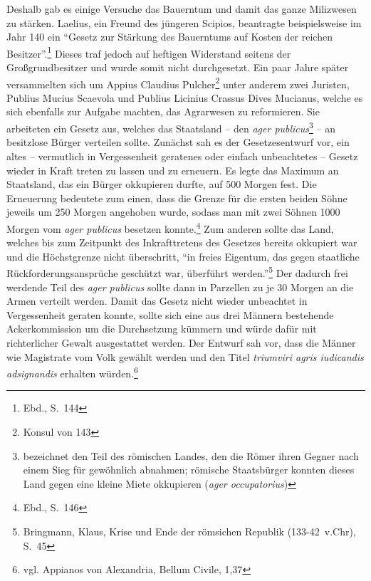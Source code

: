 \documentclass[
    12pt,
    smallheadings,
    ]{scrreprt}
\begin{document}
Deshalb gab es einige Versuche das Bauerntum und damit das ganze Milizwesen zu stärken.
Laelius, ein Freund des jüngeren Scipios, beantragte beispielsweise im Jahr 140 ein "`Gesetz zur Stärkung des Bauerntums auf Kosten der reichen Besitzer"'.\footnote{Ebd., S.~144}
 Dieses traf jedoch auf heftigen Widerstand seitens der Großgrundbesitzer und wurde somit nicht durchgesetzt.
\label{scaevola}Ein paar Jahre später versammelten sich um Appius Claudius Pulcher\footnote{Konsul von 143} unter anderem zwei Juristen, Publius Mucius Scaevola und Publius Licinius Crassus Dives Mucianus, welche es sich ebenfalls zur Aufgabe machten, das Agrarwesen zu reformieren.
Sie arbeiteten ein Gesetz aus, welches das Staatsland -- den \textit{ager publicus}\footnote{bezeichnet den Teil des römischen Landes, den die Römer ihren Gegner nach einem Sieg für gewöhnlich abnahmen; römische Staatsbürger konnten dieses Land gegen eine kleine Miete okkupieren (\textit{ager occupatorius})}
-- an besitzlose Bürger verteilen sollte.
Zunächst sah es der Gesetzesentwurf vor, ein altes -- vermutlich in Vergessenheit geratenes oder einfach unbeachtetes -- Gesetz wieder in Kraft treten zu lassen und zu erneuern.
Es legte das Maximum an Staatsland, das ein Bürger okkupieren durfte, auf 500 Morgen fest.
Die Erneuerung bedeutete zum einen, dass die Grenze für die ersten beiden Söhne jeweils um 250 Morgen angehoben wurde, sodass man mit zwei Söhnen 1000 Morgen vom \textit{ager publicus} besetzen konnte.\footnote{Ebd., S.~146}
Zum anderen sollte das Land, welches bis zum Zeitpunkt des Inkrafttretens des Gesetzes bereits okkupiert war und die Höchstgrenze nicht überschritt, "`in freies Eigentum, das gegen staatliche Rückforderungsansprüche geschützt war, überführt werden."'\footnote{Bringmann, Klaus, Krise und Ende der römsichen Republik (133-42~v.Chr), S.~45}
Der dadurch frei werdende Teil des \textit{ager publicus} sollte dann in Parzellen zu je 30 Morgen an die Armen verteilt werden.
Damit das Gesetz nicht wieder unbeachtet in Vergessenheit geraten konnte, sollte sich eine aus drei Männern bestehende Ackerkommission um die Durchsetzung kümmern und würde dafür mit richterlicher Gewalt ausgestattet werden.
Der Entwurf sah vor, dass die Männer wie Magistrate vom Volk gewählt werden und den Titel \textit{triumviri agris iudicandis adsignandis} erhalten würden.\footnote{vgl. Appianos von Alexandria, Bellum Civile, 1,37}


\end{document}
